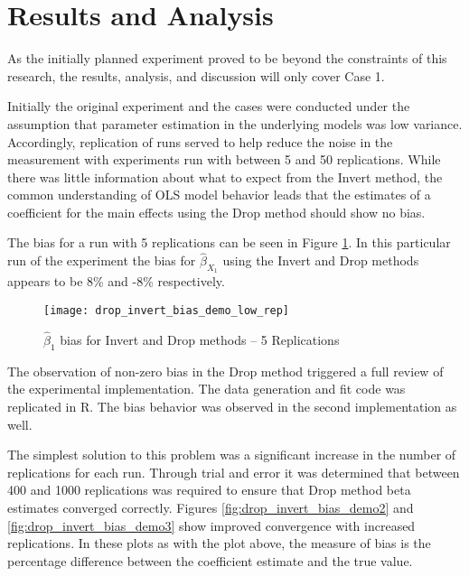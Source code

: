 \documentclass[../paper.tex]{subfiles}
\begin{document}
\section{Results and Analysis}
As the initially planned experiment proved to be beyond the constraints of this research, the results, analysis, and discussion will only cover Case 1.

Initially the original experiment and the cases were conducted under the assumption that parameter estimation in the underlying models was low variance.
Accordingly, replication of runs served to help reduce the noise in the measurement with experiments run with between 5 and 50 replications.
While there was little information about what to expect from the Invert method, the common understanding of OLS model behavior leads that the estimates of a coefficient for the main effects using the Drop method should show no bias.

The bias for a run with 5 replications can be seen in Figure \ref{fig:drop_invert_bias_demo_low_rep}. In this particular run of the experiment the bias for $\hat{\beta}_{X_{1}}$ using the Invert and Drop methods appears to be 8\% and -8\% respectively.

\begin{figure}[H]

\centering
\texttt{[image: drop\_invert\_bias\_demo\_low\_rep]}
\caption{$\hat{\beta}_{1}$ bias  for Invert and Drop methods -- 5 Replications}
\label{fig:drop_invert_bias_demo_low_rep}
\end{figure}


The observation of non-zero bias in the Drop method triggered a full review of the experimental implementation.
The data generation and fit code was replicated in R. The bias behavior was observed in the second implementation as well.


The simplest solution to this problem was a significant increase in the number of replications for each run.
Through trial and error it was determined that between 400 and 1000 replications was required to ensure that Drop method beta estimates converged correctly. Figures \ref{fig:drop_invert_bias_demo2} and \ref{fig:drop_invert_bias_demo3} show improved convergence with increased replications. In these plots as with the plot above, the measure of bias is the percentage difference between the coefficient estimate and the true value.
\end{document}
